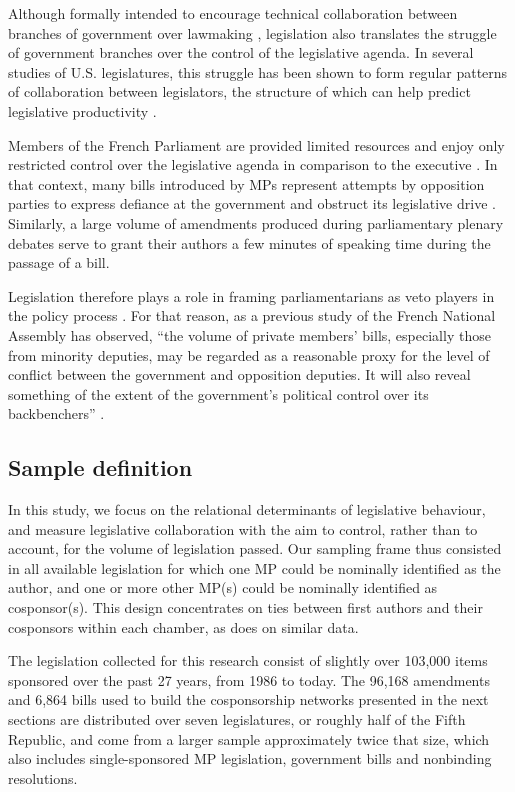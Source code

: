 
Although formally intended to encourage technical collaboration between branches of government over lawmaking \citep{Heller2001-AJPS}, legislation also translates the struggle of government branches over the control of the legislative agenda. In several studies of U.S. legislatures, this struggle has been shown to form regular patterns of collaboration between legislators, the structure of which can help predict legislative productivity \citep{Fowler2006-PA,ChoFowler2010-JP}.%

Members of the French Parliament are provided limited resources and enjoy only restricted control over the legislative agenda in comparison to the executive \citep{Kerrouche2006-JLS,BaumgartnerBrouard2014-G}. In that context, many bills introduced by MPs represent attempts by opposition parties to express defiance at the government and obstruct its legislative drive \citep{Conley2011-FP}. Similarly, a large volume of amendments produced during parliamentary plenary debates serve to grant their authors a few minutes of speaking time during the passage of a bill.%

Legislation therefore plays a role in framing parliamentarians as veto players in the policy process \citep{Tsebelis1999-APSR}. For that reason, as a previous study of the French National Assembly has observed, ``the volume of private members' bills, especially those from minority deputies, may be regarded as a reasonable proxy for the level of conflict between the government and opposition deputies. It will also reveal something of the extent of the government’s political control over its backbenchers'' \citep[p.~343]{Kerrouche2006-JLS}.%

\subsection{Sample definition}

In this study, we focus on the relational determinants of legislative behaviour, and measure legislative collaboration with the aim to control, rather than to account, for the volume of legislation passed. Our sampling frame thus consisted in all available legislation for which one MP could be nominally identified as the author, and one or more other MP(s) could be nominally identified as cosponsor(s). This design concentrates on ties between first authors and their cosponsors within each chamber, as does \citet{Fowler2006-PA} on similar data.%

The legislation collected for this research consist of slightly over 103,000 items sponsored over the past 27 years, from 1986 to today. The 96,168 amendments and 6,864 bills used to build the cosponsorship networks presented in the next sections are distributed over seven legislatures, or roughly half of the Fifth Republic, and come from a larger sample approximately twice that size, which also includes single-sponsored MP legislation, government bills and nonbinding resolutions.%

